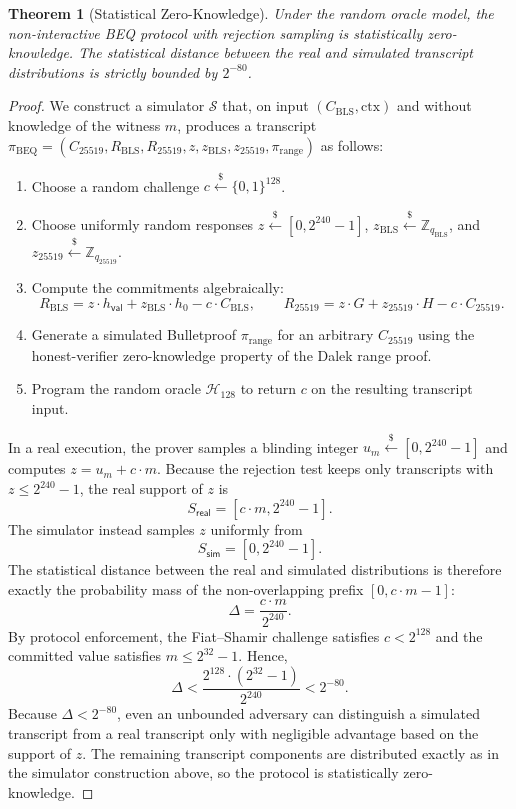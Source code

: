 \documentclass[11pt]{article}
\theoremstyle{definitionstyle}
\newtheorem{theorem}{Theorem}[section]
\theoremstyle{plain}
\begin{document}
\begin{theorem}[Statistical Zero-Knowledge]
\label{thm:beq-zk}
Under the random oracle model, the non-interactive BEQ protocol with rejection sampling is statistically zero-knowledge. The statistical distance between the real and simulated transcript distributions is strictly bounded by $2^{-80}$.
\end{theorem}
\begin{proof}
We construct a simulator $\mathcal{S}$ that, on input $(C_{\text{BLS}}, \text{ctx})$ and without knowledge of the witness $m$, produces a transcript $\pi_{\text{BEQ}} = (C_{25519}, R_{\text{BLS}}, R_{25519}, z, z_{\text{BLS}}, z_{25519}, \pi_{\text{range}})$ as follows:
\begin{enumerate}[leftmargin=*]
\item Choose a random challenge $c \xleftarrow{\$} \{0,1\}^{128}$.
\item Choose uniformly random responses $z \xleftarrow{\$} [0, 2^{240}-1]$, $z_{\text{BLS}} \xleftarrow{\$} \mathbb{Z}_{q_{\text{BLS}}}$, and $z_{25519} \xleftarrow{\$} \mathbb{Z}_{q_{25519}}$.
\item Compute the commitments algebraically:
\[
R_{\text{BLS}} = z \cdot h_{\mathsf{val}} + z_{\text{BLS}} \cdot h_0 - c \cdot C_{\text{BLS}},
\qquad
R_{25519} = z \cdot G + z_{25519} \cdot H - c \cdot C_{25519}.
\]
\item Generate a simulated Bulletproof $\pi_{\text{range}}$ for an arbitrary $C_{25519}$ using the honest-verifier zero-knowledge property of the Dalek range proof.
\item Program the random oracle $\mathcal{H}_{128}$ to return $c$ on the resulting transcript input.
\end{enumerate}
In a real execution, the prover samples a blinding integer $u_m \xleftarrow{\$} [0,2^{240}-1]$ and computes $z = u_m + c \cdot m$. Because the rejection test keeps only transcripts with $z \le 2^{240}-1$, the real support of $z$ is
\[
S_{\mathsf{real}} = [c \cdot m, 2^{240}-1].
\]
The simulator instead samples $z$ uniformly from
\[
S_{\mathsf{sim}} = [0, 2^{240}-1].
\]
The statistical distance between the real and simulated distributions is therefore exactly the probability mass of the non-overlapping prefix $[0, c \cdot m - 1]$:
\[
\Delta = \frac{c \cdot m}{2^{240}}.
\]
By protocol enforcement, the Fiat--Shamir challenge satisfies $c < 2^{128}$ and the committed value satisfies $m \le 2^{32}-1$. Hence,
\[
\Delta < \frac{2^{128} \cdot (2^{32}-1)}{2^{240}} < 2^{-80}.
\]
Because $\Delta < 2^{-80}$, even an unbounded adversary can distinguish a simulated transcript from a real transcript only with negligible advantage based on the support of $z$. The remaining transcript components are distributed exactly as in the simulator construction above, so the protocol is statistically zero-knowledge.
\end{proof}
\end{document}
